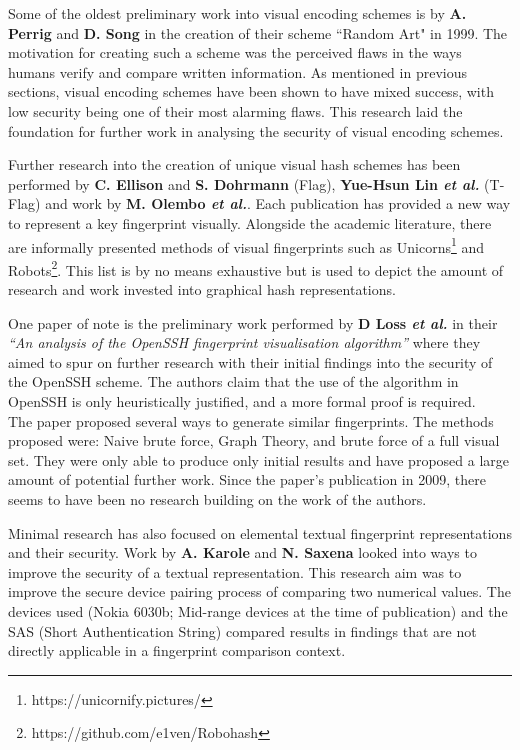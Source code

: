 Some of the oldest preliminary work into visual encoding schemes is by \textbf{A. Perrig} and \textbf{D. Song}\cite{perrig1999hash} in the creation of their scheme ``Random Art" in 1999. The motivation for creating such a scheme was the perceived flaws in the ways humans verify and compare written information. As mentioned in previous sections, visual encoding schemes have been shown to have mixed success, with low security being one of their most alarming flaws. This research laid the foundation for further work in analysing the security of visual encoding schemes.

Further research into the creation of unique visual hash schemes has been performed by \textbf{C. Ellison} and \textbf{S. Dohrmann}\cite{ellison2003public} (Flag), \textbf{Yue-Hsun Lin \textit{et al.}}\cite{lin2010spate} (T-Flag) and work by \textbf{M.  Olembo \textit{et al.}}\cite{olembo2013developing}. Each publication has provided a new way  to represent a key fingerprint visually. Alongside the academic literature, there are informally presented methods of visual fingerprints such as Unicorns\footnote{https://unicornify.pictures/} and Robots\footnote{https://github.com/e1ven/Robohash}. This list is by no means exhaustive but is used to depict the amount of research and work invested into graphical hash representations.

One paper of note is the preliminary work performed by \textbf{D Loss \textit{et al.}}\cite{loss2009drunken} in their \textit{``An analysis of the OpenSSH fingerprint visualisation algorithm''} where  they aimed to spur on further research with their initial findings into the security of the OpenSSH scheme. The authors claim that the use of the algorithm in OpenSSH is only heuristically justified, and a more formal proof is required.\\
The paper proposed several ways to generate similar fingerprints. The methods proposed were: Naive brute force, Graph Theory, and brute force of a full visual set. They were only able to produce only initial results and have proposed a large amount of potential further work. Since the paper's publication in 2009, there seems to have been no research building on the work of the authors.

Minimal research has also focused on elemental textual fingerprint representations and their security. Work by \textbf{A. Karole} and \textbf{N. Saxena}\cite{karole2009improving} looked into ways to improve the security of a textual representation. This research aim was to improve the secure device pairing process of comparing two numerical values. The devices used (Nokia 6030b; Mid-range devices at the time of publication) and the SAS (Short Authentication String) compared results in findings that are not directly applicable in a fingerprint comparison context. 

